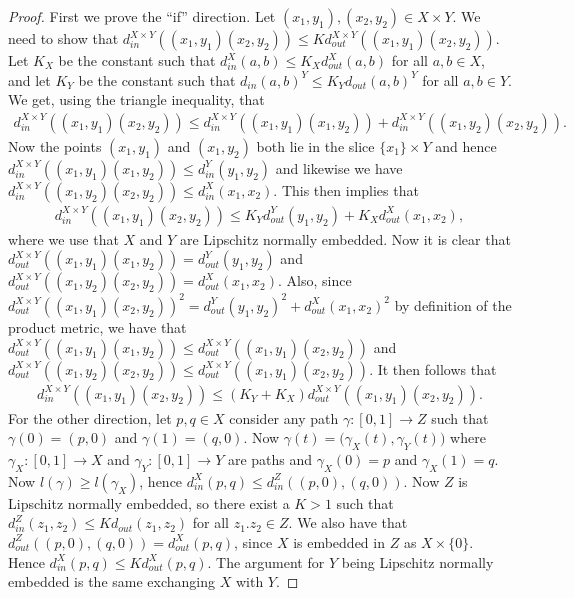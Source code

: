 \documentclass[a4paper,oneside]{amsart}
\theoremstyle{definition}
\begin{document}
\begin{proof}
First we prove the ``if'' direction.
Let $(x_1,y_1),(x_2,y_2)\in X\times Y$. We need to show that
$d_{in}^{X\times Y}((x_1,y_1)(x_2,y_2))\leq K d_{out}^{X\times
  Y}((x_1,y_1)(x_2,y_2))$. Let $K_X$ be the constant such that
$d_{in}^X(a,b) \leq K_X d_{out}^X(a,b)$ for all $a,b\in X$, and let $K_Y$
be the constant such that $d_{in}(a,b)^Y \leq K_Y d_{out}(a,b)^Y$ for all
$a,b\in Y$. We get, using the triangle inequality, that
\begin{align*}
d_{in}^{X\times Y}((x_1,y_1)(x_2,y_2))\leq d_{in}^{X\times
  Y}((x_1,y_1)(x_1,y_2))+ d_{in}^{X\times Y}((x_1,y_2)(x_2,y_2)). 
\end{align*}
Now the points $(x_1,y_1)$ and $(x_1,y_2)$ both lie in the slice
$\{x_1\}\times Y$ and hence $d_{in}^{X\times
  Y}((x_1,y_1)(x_1,y_2)) \leq d_{in}^{Y}(y_1,y_2)$ and likewise we have
  $d_{in}^{X\times 
  Y}((x_1,y_2)(x_2,y_2)) \leq d_{in}^{X}(x_1,x_2)$. This then implies that
\begin{align*}
d_{in}^{X\times Y}((x_1,y_1)(x_2,y_2))\leq K_Y d_{out}^{Y}(y_1,y_2)+
K_X d_{out}^{X}(x_1,x_2),
\end{align*}
where we use that $X$ and $Y$ are Lipschitz normally embedded. Now it
is clear that $d_{out}^{X\times Y}((x_1,y_1)(x_1,y_2)) =
d_{out}^{Y}(y_1,y_2)$ and $d_{out}^{X\times Y}((x_1,y_2)(x_2,y_2)) =
d_{out}^{X}(x_1,x_2)$. Also, since $d_{out}^{X\times
  Y}((x_1,y_1)(x_2,y_2))^2=d_{out}^{Y}(y_1,y_2)^2+
d_{out}^{X}(x_1,x_2)^2$ by definition of the product metric, we have
that $d_{out}^{X\times Y}((x_1,y_1)(x_1,y_2)) \leq d_{out}^{X\times
  Y}((x_1,y_1)(x_2,y_2))$ and  $d_{out}^{X\times
  Y}((x_1,y_2)(x_2,y_2)) \leq d_{out}^{X\times
  Y}((x_1,y_1)(x_2,y_2))$. It then follows that
\begin{align*}
d_{in}^{X\times Y}((x_1,y_1)(x_2,y_2))\leq (K_Y + K_X) d_{out}^{X\times
  Y}((x_1,y_1)(x_2,y_2)).
\end{align*} 
For the other direction, let $p,q \in X$ consider any path
${ {\gamma} \colon { [0,1] } \to {Z}}$ such that $\gamma(0) = (p,0)$ and
$\gamma(1) = (q,0)$. Now $\gamma(t)= \big(\gamma_X(t),\gamma_Y(t)\big)$ where
${ {\gamma_X} \colon { [0,1] } \to {X}}$ and ${ {\gamma_Y} \colon { [0,1] } \to {Y}}$ are
paths and $\gamma_X(0) = p$ and $\gamma_X(1) =q$. Now $l(\gamma)\geq
l(\gamma_X)$, hence $d_{in}^X(p,q) \leq d_{in}^Z((p,0),(q,0))$. Now
$Z$ is Lipschitz normally embedded, so there exist a $K>1$ such that
$d_{in}^Z(z_1,z_2)\leq K d_{out}(z_1,z_2)$ for all $z_1.z_2\in Z$. We also have that
$d_{out}^Z((p,0),(q,0))= d_{out}^X (p,q)$, since $X$ is embedded in $Z$ as
  $X\times \{ 0\}$. Hence $d_{in}^X(p,q) \leq K d_{out}^X (p,q)$. The
  argument for $Y$ being Lipschitz normally embedded is the same
  exchanging $X$ with $Y$.
\end{proof}
\end{document}
